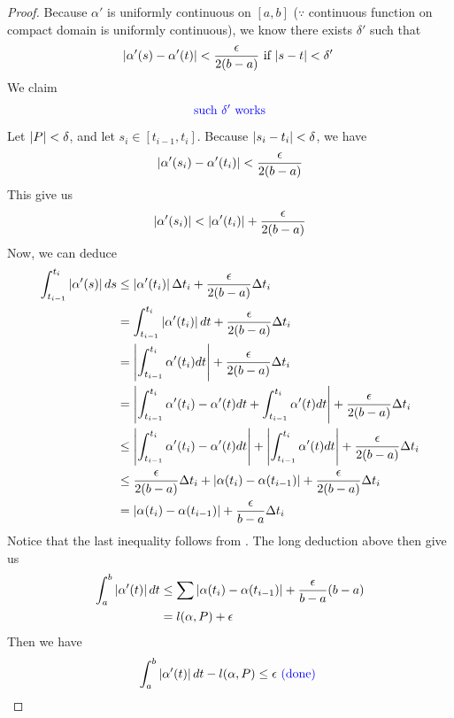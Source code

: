 \documentclass{report}
\begin{document}
\begin{proof}
Because $\alpha '$ is uniformly continuous on $[a,b]$ ($\because$ continuous function on compact domain is uniformly continuous), we know there exists $\delta ' $ such that 
\begin{align*}
\left|\alpha '(s)-\alpha '(t)\right|< \frac{\epsilon }{2(b-a)}\text{ if $\left|s-t\right|<\delta'$ }
\end{align*}
We claim 
\begin{align*}
\textcolor{blue}{\text{ such $\delta'$ works }}
\end{align*}
Let $\left|P\right|<\delta$, and let $s_i \in [t_{i-1},t_i]$. Because $\left|s_i-t_i\right|<\delta$, we have
\begin{align}
\label{siti}
\left|\alpha '(s_i)-\alpha '(t_i)\right|<\frac{\epsilon}{2(b-a)}
\end{align}
This give us 
\begin{align*}
\left|\alpha '(s_i)\right|<\left|\alpha '(t_i)\right| + \frac{\epsilon}{2(b-a)}
\end{align*}
Now, we can deduce 
\begin{align*}
  \int_{t_{i-1}}^{t_i} \left|\alpha '(s)\right|ds&\leq   \left|\alpha '(t_i)\right|\Delta t_i+ \frac{\epsilon }{2(b-a)}\Delta t_i\\
  &=\int_{t_{i-1}}^{t_i}\left|\alpha '(t_i)\right|dt + \frac{\epsilon}{2(b-a)}\Delta t_i\\
 &=\left|\int_{t_{i-1}}^{t_i} \alpha '(t_i)dt\right|+ \frac{\epsilon }{2(b-a)}\Delta t_i\\
  &=\left|\int_{t_{i-1}}^{t_i} \alpha' (t_i)-\alpha '(t)dt + \int_{t_{i-1}}^{t_i} \alpha '(t)dt \right|+ \frac{\epsilon}{2(b-a)}\Delta t_i \\
  &\leq  \left|\int_{t_{i-1}}^{t_i} \alpha '(t_i)-\alpha' (t)dt\right|+ \left|\int_{t_{i-1}}^{t_i} \alpha '(t)dt\right|+\frac{\epsilon}{2(b-a)}\Delta t_i \\
  &\leq \frac{\epsilon}{2(b-a)}\Delta t_i + \left|\alpha (t_i)-\alpha (t_{i-1})\right|+\frac{\epsilon}{2(b-a)}\Delta t_i\\
  &=\left|\alpha (t_i)-\alpha (t_{i-1})\right|+ \frac{\epsilon }{b-a}\Delta t_i
\end{align*}
Notice that the last inequality follows from . The long deduction above then give us 
\begin{align*}
  \int_{a}^b \left|\alpha '(t)\right|dt&\leq \sum \left|\alpha (t_i)-\alpha (t_{i-1})\right|+ \frac{\epsilon}{b-a} (b-a)\\
&=l(\alpha ,P)+\epsilon 
\end{align*}
Then we have 
\begin{align*}
\int_a^b \left|\alpha '(t)\right|dt -l(\alpha ,P)\leq \epsilon \textcolor{blue}{\text{ (done) }}
\end{align*}
\end{proof}
\end{document}
